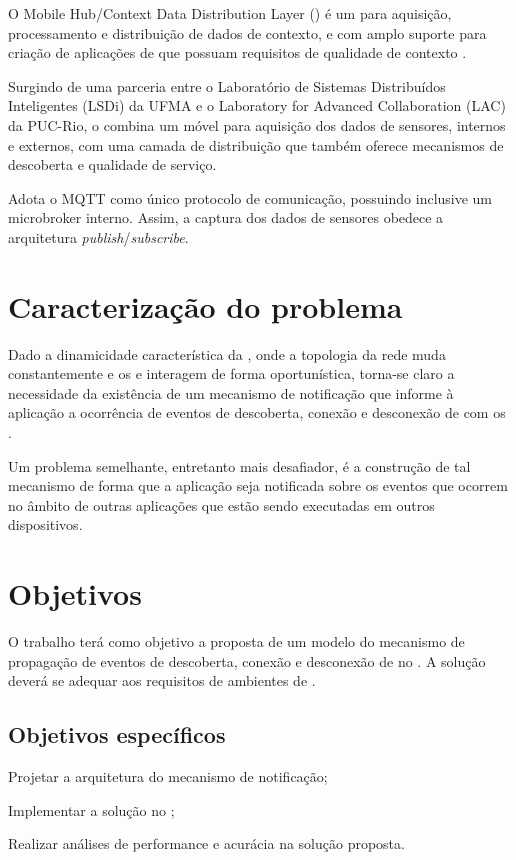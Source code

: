 O Mobile Hub/Context Data Distribution Layer (\mhubcddl) é um \middleware{} \iot{} para aquisição, processamento e distribuição de dados de contexto, e com amplo suporte para criação de aplicações de \iot{} que possuam requisitos de qualidade de contexto \cite{Gomes_2017}.

Surgindo de uma parceria entre o Laboratório de Sistemas Distribuídos Inteligentes (LSDi) da UFMA e o Laboratory for Advanced Collaboration (LAC) da PUC-Rio, o \middleware{} combina um \gateway{} móvel para aquisição dos dados de sensores, internos e externos, com uma camada de distribuição que também oferece mecanismos de descoberta e qualidade de serviço.

Adota o MQTT como único protocolo de comunicação, possuindo inclusive um microbroker interno. Assim, a captura dos dados de sensores obedece a arquitetura \textit{publish}/\textit{subscribe}.

\section{Caracterização do problema}

Dado a dinamicidade característica da \iomt{}, onde a topologia da rede muda constantemente e os \smartobjs{} e \gateways{} interagem de forma oportunística, torna-se claro a necessidade da existência de um mecanismo de notificação que informe à aplicação a ocorrência de eventos de descoberta, conexão e desconexão de \smartobjs{} com os \smartphones.

Um problema semelhante, entretanto mais desafiador, é a construção de tal mecanismo de forma que a aplicação seja notificada sobre os eventos que ocorrem no âmbito de outras aplicações que estão sendo executadas em outros dispositivos.

\section{Objetivos}

O trabalho terá como objetivo a proposta de um modelo do mecanismo de propagação de eventos de descoberta, conexão e desconexão de \smartobjs{} no \middleware{} \mhubcddl{}. A solução deverá se adequar aos requisitos de ambientes de \iomt{}.

\subsection{Objetivos específicos}

\begin{alineas}

	\item Projetar a arquitetura do mecanismo de notificação;

	\item Implementar a solução no \middleware{} \mhubcddl{};

	\item Realizar análises de performance e acurácia na solução proposta.

\end{alineas}



